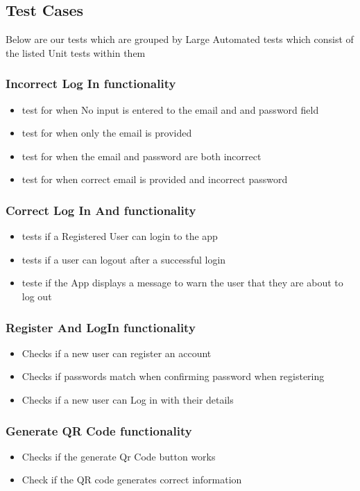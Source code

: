 \documentclass[english]{article}
\begin{document}
	\subsection {Test Cases}
	Below are our tests which are grouped by Large Automated tests which consist of the listed Unit tests within them
		\subsubsection{Incorrect Log In functionality}
		\begin{itemize} 
			\item test for when No input is entered to the email and and password field
			\item test for when only the email is provided 
			\item test for when the email and password  are both incorrect
			\item test for when correct email is provided and incorrect password
			
		\end{itemize}
		\subsubsection{Correct Log In And functionality}
		\begin{itemize} 
			\item tests if a Registered User can login to the app
			\item tests if a user can logout after a successful login
			\item teste if the App displays a message to warn the user that they are about to log out
			
		\end{itemize}

		\subsubsection{Register And LogIn functionality}
		\begin{itemize} 
			\item Checks if a new user can register an account
			\item Checks if passwords match when confirming password when registering
			\item Checks if a new user can Log in with their details 
			
		\end{itemize}
		\subsubsection{Generate QR Code functionality}
			\begin{itemize} 
				\item Checks if the generate Qr Code button works
				\item Check if the QR code generates correct information
			\end{itemize}
\end{document}
